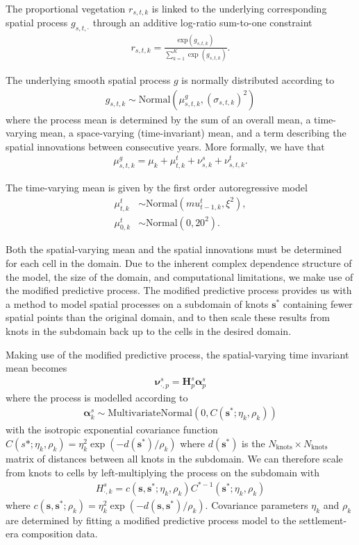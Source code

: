 \documentclass[12pt]{article}
\begin{document}
The proportional vegetation $r_{s,t,k}$ is linked to the underlying corresponding spatial process $g_{s,t,\cdot}$ through an additive log-ratio sum-to-one constraint
\begin{align*}
r_{s,t,k} = \frac{ \text{exp}(g_{s,t,k}) }{ \sum_{k=1}^K \exp (g_{s,t,k}) }.
\end{align*} 

The underlying smooth spatial process $g$ is normally distributed
according to
\begin{align*} g_{s,t,k} \sim \text{Normal} ( \mu_{s,t,k}^g , (\sigma_{s,t,k})^2 )
\end{align*}
where the process mean is determined by the sum of an overall mean, a time-varying mean, a space-varying (time-invariant) mean, and a term describing the spatial innovations between consecutive years. More formally, we have that
\begin{align*}
  \mu_{s,t,k}^g = \mu_k + \mu_{t,k}^t + \nu_{s,k}^s + \nu_{s,t,k}^t.
\end{align*}

The time-varying mean is given by the first order autoregressive model
\begin{align*}
\mu^t_{t,k} &\sim \text{Normal}(mu^t_{t-1,k}, \xi^2), \\
\mu^t_{0,k} &\sim \text{Normal}(0, 20^2).
\end{align*}

Both the spatial-varying mean and the spatial innovations must be determined for each cell in the domain. Due to the inherent complex dependence structure of the model, the size of the domain, and computational limitations, we make use of the modified predictive process. The modified predictive process provides us with a method to model spatial processes on a subdomain of knots $\bm{s^*}$ containing fewer spatial points than the original domain, and to then scale these results from knots in the subdomain back up to the cells in the desired domain. 

Making use of the modified predictive process, the spatial-varying time invariant mean becomes
\begin{align*}
\bm{\nu}_{\cdot, p}^s = \bm{H}_p^s \bm{\alpha}_{p}^s
\end{align*}
where the process is modelled according to
\begin{align*}
\bm{\alpha}^s_{k} \sim \text{MultivariateNormal}(0, C(\bm{s^{*}}; \eta_k, \rho_k)) 
\end{align*}
with the isotropic exponential covariance function $C(s*; \eta_k, \rho_k) = \eta_k^2 \exp(-d(\bm{s^*})/\rho_k )$ where $d(\bm{s^*})$ is the $N_{\text{knots}} \times N_{\text{knots}}$ matrix of distances between all knots in the subdomain. We can therefore scale from knots to cells by left-multiplying the process on the subdomain with
\begin{align*}
H^s_{\cdot,k} = c(\bm{s}, \bm{s^*}; \eta_k, \rho_k) C^{*-1}(\bm{s^*}; \eta_k, \rho_k)
\end{align*}
where $c(\bm{s}, \bm{s^*}; \rho_k) = \eta_k^2 \exp( -d(\bm{s}, \bm{s^*}) / \rho_k)$. Covariance parameters $\eta_k$ and $\rho_k$ are determined by fitting a modified predictive process model to the settlement-era composition data.
\end{document}
